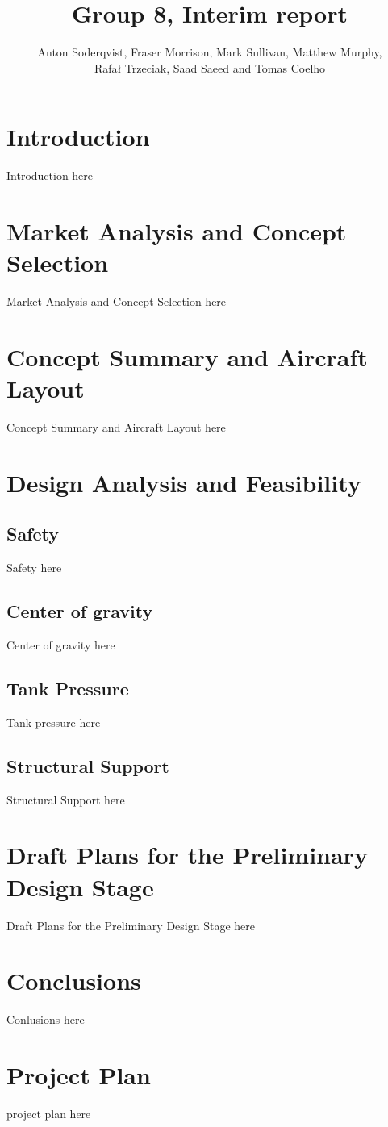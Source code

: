 \documentclass{report}
\author{Anton Soderqvist, Fraser Morrison, Mark Sullivan, Matthew Murphy, \\ Rafał Trzeciak, Saad Saeed and Tomas Coelho}
\title{Group 8, Interim report}
\begin{document}
\maketitle
\tableofcontents

\chapter{Introduction}
Introduction here

\chapter{Market Analysis and Concept Selection}
Market Analysis and Concept Selection here

\chapter{Concept Summary and Aircraft Layout}
 Concept Summary and Aircraft Layout here

\chapter{Design Analysis and Feasibility}
\section{Safety}
Safety here
\section{Center of gravity}
Center of gravity here
\section{Tank Pressure}
Tank pressure here
\section{Structural Support}
Structural Support here

\chapter{Draft Plans for the Preliminary Design Stage}
Draft Plans for the Preliminary Design Stage here

\chapter{Conclusions}
Conlusions here

\chapter{Project Plan}
project plan here
\end{document}
